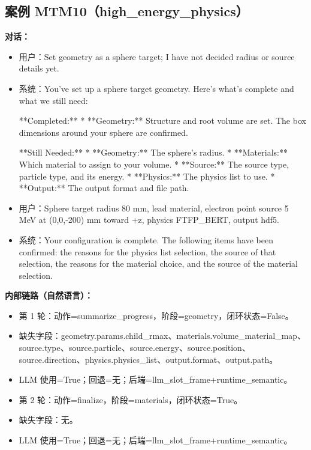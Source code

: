 \documentclass[11pt]{ctexart}
\begin{document}
\subsection{案例 MTM10（high\_energy\_physics）}
\textbf{对话：}
\begin{itemize}
\item 用户：Set geometry as a sphere target; I have not decided radius or source details yet.
\item 系统：You've set up a sphere target geometry. Here's what's complete and what we still need:

**Completed:**
*   **Geometry:** Structure and root volume are set. The box dimensions around your sphere are confirmed.

**Still Needed:**
*   **Geometry:** The sphere's radius.
*   **Materials:** Which material to assign to your volume.
*   **Source:** The source type, particle type, and its energy.
*   **Physics:** The physics list to use.
*   **Output:** The output format and file path.
\item 用户：Sphere target radius 80 mm, lead material, electron point source 5 MeV at (0,0,-200) mm toward +z, physics FTFP\_BERT, output hdf5.
\item 系统：Your configuration is complete. The following items have been confirmed: the reasons for the physics list selection, the source of that selection, the reasons for the material choice, and the source of the material selection.
\end{itemize}
\textbf{内部链路（自然语言）：}
\begin{itemize}
\item 第 1 轮：动作=summarize\_progress，阶段=geometry，闭环状态=False。
\item 缺失字段：geometry.params.child\_rmax、materials.volume\_material\_map、source.type、source.particle、source.energy、source.position、source.direction、physics.physics\_list、output.format、output.path。
\item LLM 使用=True；回退=无；后端=llm\_slot\_frame+runtime\_semantic。
\item 第 2 轮：动作=finalize，阶段=materials，闭环状态=True。
\item 缺失字段：无。
\item LLM 使用=True；回退=无；后端=llm\_slot\_frame+runtime\_semantic。
\end{itemize}
\end{document}
